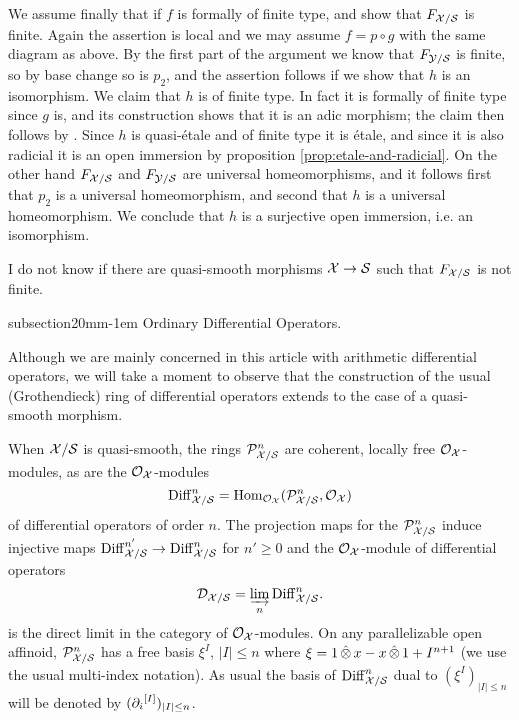 \documentclass{article}
\makeatletter
\theoremstyle{change}
\renewcommand{\subsection}{\@startsection%
{subsection}{2}{0mm}{\baselineskip}{-1em}%
{\normalfont\normalsize\bfseries}}
\numberwithin{equation}{subsubsection}
\newcommand{\demobox}{\vrule height6pt width6pt depth0pt}
\newenvironment{demo}{\noindent{\it Proof.}}
{{\unskip\nobreak\hfil\qquad
\demobox\parfillskip=0pt\par}
\medskip}
\makeatother
\begin{document}
\begin{demo}
  We assume finally that if $f$ is formally of finite type, and show
  that $F_{{\cal X}/{\cal S}}$ is finite. Again the assertion is local and we
  may assume $f=p\circ g$ with the same diagram as above. By the first
  part of the argument we know that $F_{{\cal Y}/{\cal S}}$ is finite, so by
  base change so is $p_2$, and the assertion follows if we show that
  $h$ is an isomorphism. We claim that $h$ is of finite type. In fact
  it is formally of finite type since $g$ is, and its construction
  shows that it is an adic morphism; the claim then follows by \cite[I
  Prop. 10.13.1]{EGA}. Since $h$ is quasi-\'etale and of finite type
  it is \'etale, and since it is also radicial it is an open immersion
  by proposition \ref{prop:etale-and-radicial}. On the other hand
  $F_{{\cal X}/{\cal S}}$ and $F_{{\cal Y}/{\cal S}}$ are universal homeomorphisms, and it
  follows first that $p_2$ is a universal homeomorphism, and second
  that $h$ is a universal homeomorphism. We conclude that $h$ is a
  surjective open immersion, i.e. an isomorphism.
\end{demo}

I do not know if there are quasi-smooth morphisms ${\cal X}\to{\cal S}$ such
that $F_{{\cal X}/{\cal S}}$ is not finite.

\subsection{Ordinary Differential Operators.}
\label{sec:diff-ord}

Although we are mainly concerned in this article with arithmetic
differential operators, we will take a moment to observe that the
construction of the usual (Grothendieck) ring of differential
operators extends to the case of a quasi-smooth morphism.

When ${\cal X}/{\cal S}$ is quasi-smooth, the rings ${\cal P}^n_{{\cal X}/{\cal S}}$ are coherent,
locally free ${\cal O}_{\cal X}$-modules, as are the ${\cal O}_{\cal X}$-modules
\begin{displaymath}
  {\operatorname{Diff}}^n_{{\cal X}/{\cal S}}={\operatorname{Hom}}_{{\cal O}_{\cal X}}({\cal P}^n_{{\cal X}/{\cal S}},{\cal O}_{\cal X})
\end{displaymath}
of differential operators of order $n$. The projection maps for the
${\cal P}^n_{{\cal X}/{\cal S}}$ induce injective maps
${\operatorname{Diff}}^{n'}_{{\cal X}/{\cal S}}\to{\operatorname{Diff}}^n_{{\cal X}/{\cal S}}$ for $n'\ge0$ and the
${\cal O}_{\cal X}$-module of differential operators
\begin{displaymath}
  {\cal D}_{{\cal X}/{\cal S}}=\varinjlim_n{\operatorname{Diff}}^n_{{\cal X}/{\cal S}}.
\end{displaymath}
is the direct limit in the category of ${\cal O}_{\cal X}$-modules.  On any
parallelizable open affinoid, ${\cal P}^n_{{\cal X}/{\cal S}}$ has a free basis
$\xi^I$, $|I|\le n$ where $\xi=1\mathop{\hat\otimes} x-x\mathop{\hat\otimes}1+I^{n+1}$ (we use the
usual multi-index notation). As usual the basis of ${\operatorname{Diff}}^n_{{\cal X}/{\cal S}}$
dual to $(\xi^I)_{|I|\le n}$ will be denoted by
$({{\partial}_i}^{[{I}]})_{|I|\le n}$.
\end{document}

